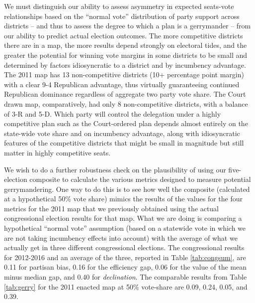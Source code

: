 \par
	We must distinguish our ability to assess asymmetry in expected seats-vote relationships based on the ``normal vote'' distribution of party support across districts -- and thus to assess the degree to which a plan is a gerrymander -- from our ability to predict actual election outcomes. The more competitive districts there are in a map, the more results depend strongly on electoral tides, and the greater the potential for winning vote margins in some districts to be small and determined by factors idiosyncratic to a district and by incumbency advantage. The 2011 map has 13 non-competitive districts (10+ percentage point margin) with a clear 9-4 Republican advantage, thus virtually guaranteeing continued Republican dominance regardless of aggregate two party vote share. The Court drawn map, comparatively, had only 8 non-competitive districts, with a balance of 3-R and 5-D. Which party will control the delegation under a highly competitive plan such as the Court-ordered plan depends almost entirely on the state-wide vote share and on incumbency advantage, along with idiosyncratic features of the competitive districts that might be small in magnitude but still matter in highly competitive seats. 
\par
    We wish to do a further robustness check on the plausibility of using our five-election composite to calculate the various metrics designed to measure potential gerrymandering. One way to do this is to see how well the composite (calculated at a hypothetical 50\% vote share) mimics the results of the values for the four metrics for the 2011 map that we previously obtained using the actual congressional election results for that map. What we are doing is comparing a hypothetical ``normal vote'' \citep{Converse1966} assumption (based on a statewide vote in which we are not taking incumbency effects into account) with the average of what we actually get in three different congressional elections. The congressional results for 2012-2016 and an average of the three, reported in Table \ref{tab:congsum}, are 0.11 for partisan bias, 0.16 for the efficiency gap, 0.06 for the value of the mean minus median gap, and 0.40 for \textit{declination}. The comparable results from Table \ref{tab:gerry} for the 2011 enacted map at 50\% vote-share are 0.09, 0.24, 0.05, and 0.39.
